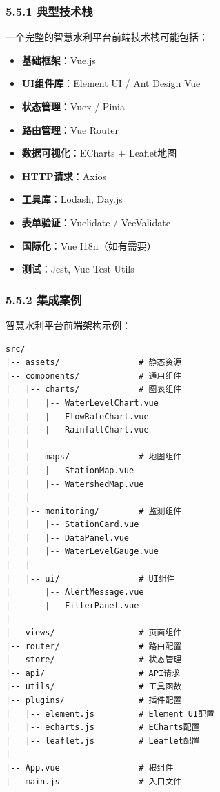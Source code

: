 \subsubsection{5.5.1 典型技术栈}\label{ux5178ux578bux6280ux672fux6808}

一个完整的智慧水利平台前端技术栈可能包括：

\begin{itemize}
\tightlist
\item
  \textbf{基础框架}：Vue.js
\item
  \textbf{UI组件库}：Element UI / Ant Design Vue
\item
  \textbf{状态管理}：Vuex / Pinia
\item
  \textbf{路由管理}：Vue Router
\item
  \textbf{数据可视化}：ECharts + Leaflet地图
\item
  \textbf{HTTP请求}：Axios
\item
  \textbf{工具库}：Lodash, Day.js
\item
  \textbf{表单验证}：Vuelidate / VeeValidate
\item
  \textbf{国际化}：Vue I18n（如有需要）
\item
  \textbf{测试}：Jest, Vue Test Utils
\end{itemize}

\subsubsection{5.5.2 集成案例}\label{ux96c6ux6210ux6848ux4f8b}

智慧水利平台前端架构示例：

\begin{lstlisting}
src/
|-- assets/                # 静态资源
|-- components/            # 通用组件
|   |-- charts/            # 图表组件
|   |   |-- WaterLevelChart.vue
|   |   |-- FlowRateChart.vue
|   |   |-- RainfallChart.vue
|   |
|   |-- maps/              # 地图组件
|   |   |-- StationMap.vue
|   |   |-- WatershedMap.vue
|   |
|   |-- monitoring/        # 监测组件
|   |   |-- StationCard.vue
|   |   |-- DataPanel.vue
|   |   |-- WaterLevelGauge.vue
|   |
|   |-- ui/                # UI组件
|       |-- AlertMessage.vue
|       |-- FilterPanel.vue
|
|-- views/                 # 页面组件
|-- router/                # 路由配置
|-- store/                 # 状态管理
|-- api/                   # API请求
|-- utils/                 # 工具函数
|-- plugins/               # 插件配置
|   |-- element.js         # Element UI配置
|   |-- echarts.js         # ECharts配置
|   |-- leaflet.js         # Leaflet配置
|
|-- App.vue                # 根组件
|-- main.js                # 入口文件
\end{lstlisting}

